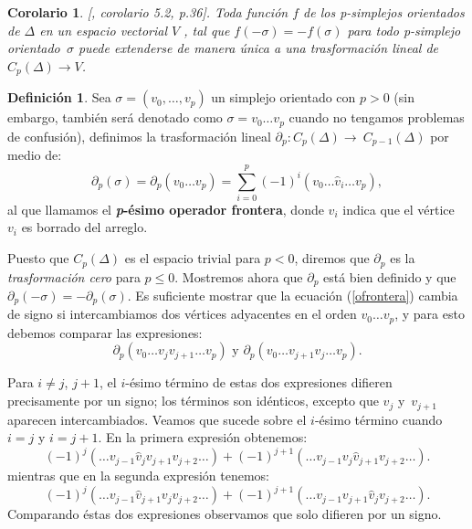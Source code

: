 \documentclass[12pt]{book}
\newtheorem{corollary}[theorem]{Corolario}
\theoremstyle{definition}
\newtheorem{definition}[theorem]{Definición}
\newcounter{in}
\newcounter{ini}
\begin{document}
\begin{corollary}{[\cite{munkres1984elements}, corolario 5.2, p.36]}.
  Toda función $f$ de los p-simplejos orientados de $\Delta$ en un
  espacio vectorial $V$ , tal que $f(-\sigma)=-f(\sigma)$ para todo
  p-simplejo orientado~$\sigma$ puede extenderse de manera única a una
  trasformación lineal de $C_{p}(\Delta)\rightarrow V$.
\end{corollary}

\begin{definition}
  Sea $\sigma=(v_{0},\ldots ,v_{p})$ un simplejo orientado con $p>0$
  (sin embargo, también será denotado como $\sigma=v_{0}\ldots v_{p}$
  cuando no tengamos problemas de confusión),
  definimos la trasformación lineal
  $\partial_{p}:C_{p}(\Delta)\rightarrow~C_{p-1}(\Delta)$ por medio de:
  \begin{equation}
    \label{ofrontera}
    \partial_{p}(\sigma)=\partial_{p}(v_{0}\ldots
    v_{p})=\sum^{p}_{i=0}(-1)^{i}(v_{0}\ldots \widehat v_{i}\ldots v_{p}),
  \end{equation}
  al que llamamos el \textbf{\emph{p}-ésimo operador frontera}, donde
  $\widehat v_{i}$ indica que el vértice $v_{i}$ es borrado del arreglo.
\end{definition}

Puesto que $C_{p}(\Delta)$ es el espacio trivial para $p<0$, diremos
que $\partial_{p}$ es la \textit{trasformación cero} para $p\leq
0$. Mostremos ahora que $\partial_{p}$ está bien definido y que
$\partial_{p}(-\sigma)=-\partial_{p}(\sigma)$. Es suficiente
mostrar que la ecuación (\ref{ofrontera}) cambia de signo si intercambiamos dos
vértices adyacentes en el orden $v_{0}\ldots v_{p}$, y para esto
debemos comparar las expresiones:
$$\partial_{p}(v_{0}\ldots v_{j} v_{j+1} \ldots v_{p}) \mbox{ y } \partial_{p}(v_{0}\ldots v_{j+1} v_{j} \ldots v_{p}).$$

Para $i\neq j$, $j+1$, el $i$-ésimo término de estas dos expresiones
difieren precisamente por un signo; los términos son idénticos,
excepto que $v_{j}$ y~$v_{j+1}$ aparecen intercambiados. Veamos que
sucede sobre el $i$-ésimo término cuando $i=j$ y $i=j+1$. En la primera
expresión obtenemos:
$$(-1)^{j}(\ldots v_{j-1} \widehat v_{j}v_{j+1}v_{j+2}\ldots)+(-1)^{j+1}(\ldots v_{j-1}v_{j}\widehat v_{j+1}v_{j+2}\ldots).$$
mientras que en la segunda expresión tenemos:
$$(-1)^{j}(\ldots v_{j-1}\widehat v_{j+1}v_{j}v_{j+2}\ldots)+(-1)^{j+1}(\ldots v_{j-1}v_{j+1}\widehat v_{j}v_{j+2}\ldots).$$
Comparando éstas dos expresiones observamos que solo difieren por un signo.
\end{document}
